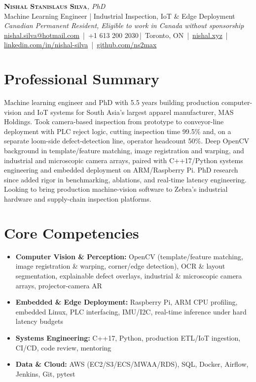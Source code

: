 \documentclass[11pt]{article}
\makeatletter
\newcommand{\cvName}{Nishal Stanislaus Silva}
\newcommand{\cvEmail}{nishal.silva@hotmail.com}
\newcommand{\cvPhone}{+1 613 200 2030}
\newcommand{\cvCity}{Toronto, ON}
\newcommand{\cvSite}{https://nishal.xyz}
\newcommand{\cvLinkedIn}{https://www.linkedin.com/in/nishal-silva}
\newcommand{\cvGitHub}{https://github.com/ns2max}
\newcommand{\cvStatus}{Canadian Permanent Resident, Eligible to work in Canada without sponsorship}
\newcommand{\cvTagline}{Machine Learning Engineer | Industrial Inspection, IoT \& Edge Deployment}
\makeatother
\begin{document}
\pagestyle{empty}
\begin{center}
    {\LARGE \scshape \textbf{\cvName}}{\large \textit{, PhD}}\\[1pt]
    {\small \cvTagline}\\[1pt]
    {\footnotesize\textit{\cvStatus}}\\[1pt]
    {\small
    \href{mailto:\cvEmail}{\cvEmail} \,|\, \cvPhone \,|\, \cvCity
    \,|\, \href{\cvSite}{nishal.xyz} \,|\, \href{\cvLinkedIn}{linkedin.com/in/nishal-silva}
    \,|\, \href{\cvGitHub}{github.com/ns2max}}
\end{center}

\section*{Professional Summary}
Machine learning engineer and PhD with 5.5 years building production computer-vision and IoT systems for South Asia's largest apparel manufacturer, MAS Holdings. Took camera-based inspection from prototype to conveyor-line deployment with PLC reject logic, cutting inspection time 99.5\% and, on a separate loom-side defect-detection line, operator headcount 50\%. Deep OpenCV background in template/feature matching, image registration and warping, and industrial and microscopic camera arrays, paired with C++17/Python systems engineering and embedded deployment on ARM/Raspberry Pi. PhD research since added rigor in benchmarking, ablations, and real-time latency engineering. Looking to bring production machine-vision software to Zebra's industrial hardware and supply-chain inspection platforms.

\section*{Core Competencies}
\begin{itemize}[leftmargin=1.4em, itemsep=-0.2em, topsep=0.1em]
    \item \textbf{Computer Vision \& Perception:} OpenCV (template/feature matching, image registration \& warping, corner/edge detection), OCR \& layout segmentation, explainable defect overlays, industrial \& microscopic camera arrays, projector-camera AR
    \item \textbf{Embedded \& Edge Deployment:} Raspberry Pi, ARM CPU profiling, embedded Linux, PLC interfacing, IMU/I2C, real-time inference under hard latency budgets
    \item \textbf{Systems Engineering:} C++17, Python, production ETL/IoT ingestion, CI/CD, code review, mentoring
    \item \textbf{Data \& Cloud:} AWS (EC2/S3/ECS/MWAA/RDS), SQL, Docker, Airflow, Jenkins, Git, pytest
\end{itemize}
\end{document}
